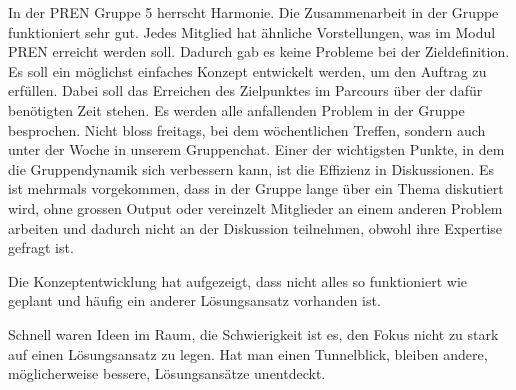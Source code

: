 \documentclass[../main.tex]{subfiles}
\begin{document}
In der PREN Gruppe 5 herrscht Harmonie.
\newline
\newline
Die Zusammenarbeit in der Gruppe funktioniert sehr gut. Jedes Mitglied hat ähnliche Vorstellungen, was im Modul PREN erreicht werden soll. Dadurch gab es keine Probleme bei der Zieldefinition. Es soll ein möglichst einfaches Konzept entwickelt werden, um den Auftrag zu erfüllen. Dabei soll das Erreichen des Zielpunktes im Parcours über der dafür benötigten Zeit stehen. Es werden alle anfallenden Problem in der Gruppe besprochen. Nicht bloss freitags, bei dem wöchentlichen Treffen, sondern auch unter der Woche in unserem Gruppenchat. Einer der wichtigsten Punkte, in dem die Gruppendynamik sich verbessern kann, ist die Effizienz in Diskussionen. Es ist mehrmals vorgekommen, dass in der Gruppe lange über ein Thema diskutiert wird, ohne grossen Output oder vereinzelt Mitglieder an einem anderen Problem arbeiten und dadurch nicht an der Diskussion teilnehmen, obwohl ihre Expertise gefragt ist.

Die Konzeptentwicklung hat aufgezeigt, dass nicht alles so funktioniert wie geplant und häufig ein anderer Lösungsansatz vorhanden ist. 

Schnell waren Ideen im Raum, die Schwierigkeit ist es, den Fokus nicht zu stark auf einen Lösungsansatz zu legen. Hat man einen Tunnelblick, bleiben andere, möglicherweise bessere, Lösungsansätze unentdeckt. 
\end{document}
